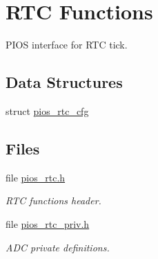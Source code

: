 \hypertarget{group___p_i_o_s___r_t_c}{\section{\-R\-T\-C \-Functions}
\label{group___p_i_o_s___r_t_c}
}


\-P\-I\-O\-S interface for \-R\-T\-C tick.  


\subsection*{\-Data \-Structures}
\begin{DoxyCompactItemize}
\item 
struct \hyperlink{structpios__rtc__cfg}{pios\-\_\-rtc\-\_\-cfg}
\end{DoxyCompactItemize}
\subsection*{\-Files}
\begin{DoxyCompactItemize}
\item 
file \hyperlink{pios__rtc_8h}{pios\-\_\-rtc.\-h}
\begin{DoxyCompactList}\small\item\em \-R\-T\-C functions header. \end{DoxyCompactList}\item 
file \hyperlink{pios__rtc__priv_8h}{pios\-\_\-rtc\-\_\-priv.\-h}
\begin{DoxyCompactList}\small\item\em \-A\-D\-C private definitions. \end{DoxyCompactList}\end{DoxyCompactItemize}
